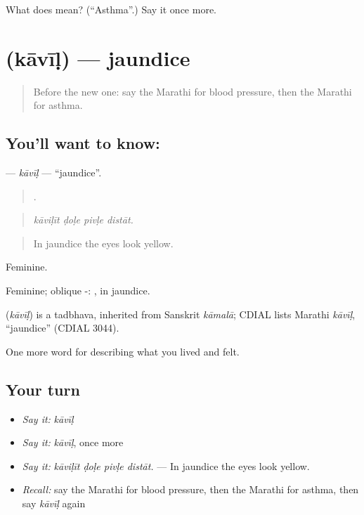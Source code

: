 \begin{tcolorbox}[breakable,colback=teal!4,colframe=teal!35!black,title={Before you move on}]
What does  mean? (\textquotedblleft{}Asthma\textquotedblright{}.) Say it once more.
\end{tcolorbox}
\section[\texorpdfstring{\mr{कावीळ} (kāvīḷ)}{कावीळ (kāvīḷ)}]{ (kāvīḷ) — jaundice}

\label{lesson:MR-C485-kavil}



\begin{quote}
Before the new one: say the Marathi for blood pressure, then the Marathi for asthma.
\end{quote}

\subsection*{You'll want to know: }
\textbf{} — \emph{kāvīḷ} — \textquotedblleft{}jaundice\textquotedblright{}.

\begin{quote}
   .
\end{quote}

\begin{quote}
\emph{kāviḷīt ḍoḷe pivḷe distāt.}
\end{quote}

\begin{quote}
In jaundice the eyes look yellow.
\end{quote}

Feminine.

Feminine; oblique -: , in jaundice.

\begin{cousinweb}
\textbf{} (\emph{kāvīḷ}) is a tadbhava, inherited from Sanskrit \emph{kāmalā}; CDIAL lists Marathi \emph{kāvīḷ}, \textquotedblleft{}jaundice\textquotedblright{} (CDIAL 3044).
\end{cousinweb}

\begin{grammarlens}[title={What you've built}]
One more word for describing what you lived and felt.
\end{grammarlens}

\subsection*{Your turn}
\begin{itemize}
\raggedright
  \item \emph{Say it:} \emph{kāvīḷ}
  \item \emph{Say it:} \emph{kāvīḷ}, once more
  \item \emph{Say it:} \emph{kāviḷīt ḍoḷe pivḷe distāt.} — In jaundice the eyes look yellow.
  \item \emph{Recall:} say the Marathi for blood pressure, then the Marathi for asthma, then say \emph{kāvīḷ} again
\end{itemize}

